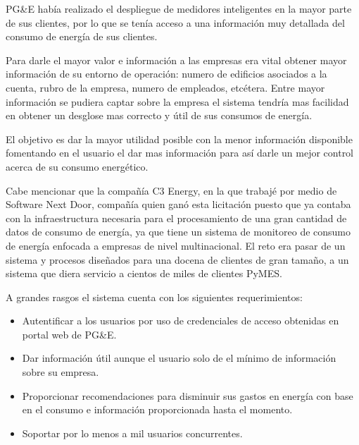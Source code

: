 \documentclass{article}
\begin{document}
PG\&E había realizado el despliegue de medidores inteligentes en la
mayor parte de sus clientes, por lo que se tenía acceso a una información
muy detallada del consumo de energía de sus clientes.

Para darle el mayor valor e información a las empresas era
vital obtener mayor información de su entorno de operación: numero
de edificios asociados a la cuenta, rubro de la empresa, numero de
empleados, etcétera. Entre mayor información se pudiera captar sobre la
empresa el sistema tendría mas facilidad en obtener un desglose
mas correcto y útil de sus consumos de energía.

El objetivo es dar la mayor utilidad posible con la menor
información disponible fomentando en el usuario el dar mas
información para así darle un mejor control acerca de su consumo energético.

Cabe mencionar que la compañía C3 Energy, en la que trabajé
por medio de Software Next Door, compañía quien ganó esta licitación puesto
que ya contaba con la infraestructura necesaria para el procesamiento
de una gran cantidad de datos de consumo de energía, ya que tiene un sistema
de monitoreo de consumo de energía enfocada a empresas de nivel
multinacional. El reto era pasar de un sistema y procesos diseñados
para una docena de clientes de gran tamaño, a un sistema que diera
servicio a cientos de miles de clientes PyMES.

A grandes rasgos el sistema cuenta con los siguientes requerimientos:
\begin{itemize}
\item Autentificar a los usuarios por uso de credenciales de acceso
  obtenidas en portal web de PG\&E.
\item Dar información útil aunque el usuario solo de
  el mínimo de información sobre su empresa.
\item Proporcionar recomendaciones para disminuir sus
  gastos en energía con base en el consumo e información proporcionada
  hasta el momento.
\item Soportar por lo menos a mil usuarios concurrentes.
\end{itemize}
\end{document}
